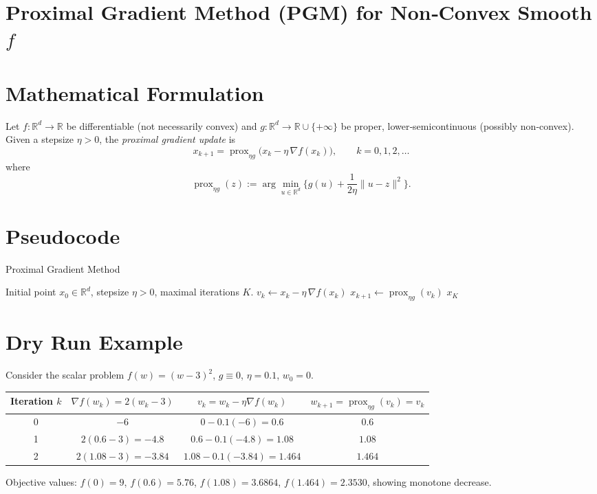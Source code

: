 \documentclass{article}
\newcommand{\prox}{\operatorname{prox}}
\newcommand{\grad}{\nabla}
\newcommand{\R}{\mathbb{R}}
\begin{document}
\section*{Proximal Gradient Method (PGM) for Non‑Convex Smooth $f$}

\section*{Mathematical Formulation}
Let $f:\R^d\to\R$ be differentiable (not necessarily convex) and $g:\R^d\to\R\cup\{+\infty\}$ be proper, lower‑semicontinuous (possibly non‑convex).  
Given a stepsize $\eta>0$, the \emph{proximal gradient update} is
\[
x_{k+1}= \prox_{\eta g}\!\bigl(x_k-\eta\,\grad f(x_k)\bigr),\qquad k=0,1,2,\dots
\tag{1}
\]
where
\[
\prox_{\eta g}(z):=\arg\min_{u\in\R^d}\Big\{ g(u)+\frac{1}{2\eta}\|u-z\|^2\Big\}.
\tag{2}
\]

\section*{Pseudocode}
\begin{algorithm}[H]
\caption{Proximal Gradient Method}
\begin{algorithmic}[1]
\Require Initial point $x_0\in\R^d$, stepsize $\eta>0$, maximal iterations $K$.
    \State $v_k \gets x_k-\eta\,\grad f(x_k)$ 
    \State $x_{k+1} \gets \prox_{\eta g}(v_k)$ 
\EndFor
\State \Return $x_K$
\end{algorithmic}
\end{algorithm}

\section*{Dry Run Example}
Consider the scalar problem $f(w)=(w-3)^2$, $g\equiv0$, $\eta=0.1$, $w_0=0$.

\begin{center}
\begin{tabular}{c|c|c|c}
Iteration $k$ & $\grad f(w_k)=2(w_k-3)$ & $v_k=w_k-\eta\grad f(w_k)$ & $w_{k+1}= \prox_{\eta g}(v_k)=v_k$ \\ \hline
0 & $-6$ & $0-0.1(-6)=0.6$ & $0.6$ \\
1 & $2(0.6-3)=-4.8$ & $0.6-0.1(-4.8)=1.08$ & $1.08$ \\
2 & $2(1.08-3)=-3.84$ & $1.08-0.1(-3.84)=1.464$ & $1.464$ 
\end{tabular}
\end{center}
Objective values: $f(0)=9$, $f(0.6)=5.76$, $f(1.08)=3.6864$, $f(1.464)=2.3530$,
showing monotone decrease.
\end{document}
